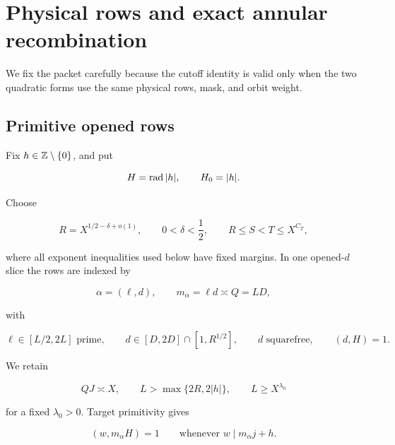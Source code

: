 \section{Physical rows and exact annular recombination}
\label{sec:tpc26-interface-recombination}

We fix the packet carefully because the cutoff identity is valid only
when the two quadratic forms use the same physical rows, mask, and
orbit weight.

\subsection{Primitive opened rows}

Fix \(h\in\mathbb Z\setminus\{0\}\), and put

\begin{equation}
 H=\operatorname{rad}|h|,
 \qquad H_0=|h|.
 \label{eq:tpc26-H-H0}
\end{equation}

Choose

\begin{equation}
 R=X^{1/2-\delta+o(1)},
 \qquad 0<\delta<\frac12,
 \qquad R\le S<T\le X^{C_T},
 \label{eq:tpc26-RST}
\end{equation}

where all exponent inequalities used below have fixed margins.  In one
opened-\(d\) slice the rows are indexed by

\begin{equation}
 \alpha=(\ell,d),
 \qquad
 m_\alpha=\ell d\asymp Q=LD,
 \label{eq:tpc26-row-index}
\end{equation}

with

\begin{equation}
 \ell\in[L/2,2L]\text{ prime},
 \qquad d\in[D,2D]\cap[1,R^{1/2}],
 \qquad d\text{ squarefree},
 \qquad(d,H)=1.
 \label{eq:tpc26-row-support}
\end{equation}

We retain

\begin{equation}
 QJ\asymp X,
 \qquad L>\max\{2R,2|h|\},
 \qquad L\ge X^{\lambda_0}
 \label{eq:tpc26-row-scales}
\end{equation}

for a fixed \(\lambda_0>0\).  Target primitivity gives

\begin{equation}
 (w,m_\alpha H)=1
 \qquad\text{whenever }w\mid m_\alpha j+h.
 \label{eq:tpc26-target-primitivity}
\end{equation}


